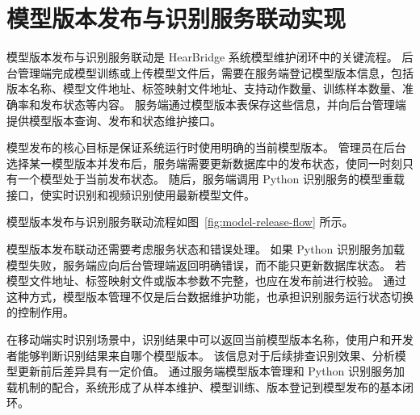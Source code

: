
\section{模型版本发布与识别服务联动实现}

模型版本发布与识别服务联动是 HearBridge 系统模型维护闭环中的关键流程。
后台管理端完成模型训练或上传模型文件后，需要在服务端登记模型版本信息，包括版本名称、模型文件地址、标签映射文件地址、支持动作数量、训练样本数量、准确率和发布状态等内容。
服务端通过模型版本表保存这些信息，并向后台管理端提供模型版本查询、发布和状态维护接口。

模型发布的核心目标是保证系统运行时使用明确的当前模型版本。
管理员在后台选择某一模型版本并发布后，服务端需要更新数据库中的发布状态，使同一时刻只有一个模型处于当前发布状态。
随后，服务端调用 Python 识别服务的模型重载接口，使实时识别和视频识别使用最新模型文件。

模型版本发布与识别服务联动流程如图~\ref{fig:model-release-flow} 所示。


模型版本发布联动还需要考虑服务状态和错误处理。
如果 Python 识别服务加载模型失败，服务端应向后台管理端返回明确错误，而不能只更新数据库状态。
若模型文件地址、标签映射文件或版本参数不完整，也应在发布前进行校验。
通过这种方式，模型版本管理不仅是后台数据维护功能，也承担识别服务运行状态切换的控制作用。

在移动端实时识别场景中，识别结果中可以返回当前模型版本名称，使用户和开发者能够判断识别结果来自哪个模型版本。
该信息对于后续排查识别效果、分析模型更新前后差异具有一定价值。
通过服务端模型版本管理和 Python 识别服务加载机制的配合，系统形成了从样本维护、模型训练、版本登记到模型发布的基本闭环。
